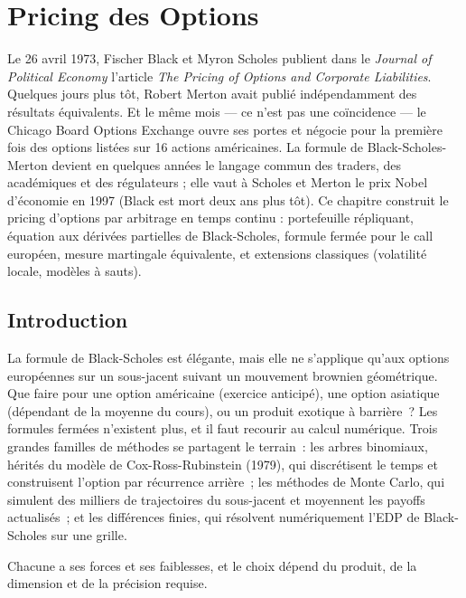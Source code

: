 \chapter{Pricing des Options}
\label{ch:pricing}

Le 26 avril 1973, Fischer Black et Myron Scholes publient dans le \emph{Journal of Political Economy} l'article \emph{The Pricing of Options and Corporate Liabilities}. Quelques jours plus tôt, Robert Merton avait publié indépendamment des résultats équivalents. Et le même mois --- ce n'est pas une coïncidence --- le Chicago Board Options Exchange ouvre ses portes et négocie pour la première fois des options listées sur 16 actions américaines. La formule de Black-Scholes-Merton devient en quelques années le langage commun des traders, des académiques et des régulateurs ; elle vaut à Scholes et Merton le prix Nobel d'économie en 1997 (Black est mort deux ans plus tôt). Ce chapitre construit le pricing d'options par arbitrage en temps continu : portefeuille répliquant, équation aux dérivées partielles de Black-Scholes, formule fermée pour le call européen, mesure martingale équivalente, et extensions classiques (volatilité locale, modèles à sauts).

\section{Introduction}

La formule de Black-Scholes est \'el\'egante, mais elle ne s'applique qu'aux options europ\'eennes sur un sous-jacent suivant un mouvement brownien g\'eom\'etrique. Que faire pour une option am\'ericaine (exercice anticip\'e), une option asiatique (d\'ependant de la moyenne du cours), ou un produit exotique \`a barri\`ere~? Les formules ferm\'ees n'existent plus, et il faut recourir au calcul num\'erique. Trois grandes familles de m\'ethodes se partagent le terrain~: les arbres binomiaux, h\'erit\'es du mod\`ele de Cox-Ross-Rubinstein (1979), qui discr\'etisent le temps et construisent l'option par r\'ecurrence arri\`ere~; les m\'ethodes de Monte Carlo, qui simulent des milliers de trajectoires du sous-jacent et moyennent les payoffs actualis\'es~; et les diff\'erences finies, qui r\'esolvent num\'eriquement l'EDP de Black-Scholes sur une grille.

Chacune a ses forces et ses faiblesses, et le choix d\'epend du produit, de la dimension et de la pr\'ecision requise.

